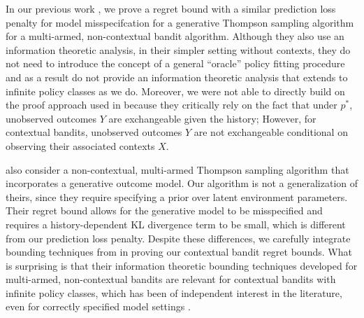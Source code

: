 In our previous work \citep{psar2024}, we prove a regret bound with a similar prediction loss penalty for model misspecifcation for a generative Thompson sampling algorithm for a multi-armed, non-contextual bandit algorithm. Although they also use an information theoretic analysis, in their simpler setting without contexts, they do not need to introduce the concept of a general ``oracle'' policy fitting procedure and as a result do not provide an information theoretic analysis that extends to infinite policy classes as we do.
Moreover, we were not able to directly build on the proof approach used in \citet{psar2024} because they critically rely on the fact that under $p^*$, unobserved outcomes $Y$ are exchangeable given the history; However, for contextual bandits, unobserved outcomes $Y$ are not exchangeable conditional on observing their associated contexts $X$. 

\citet{wen2021predictions} also consider a non-contextual, multi-armed Thompson sampling algorithm that incorporates a generative outcome model. Our algorithm is not a generalization of theirs, since they require specifying a prior over latent environment parameters. Their regret bound allows for the generative model to be misspecified and requires a history-dependent KL divergence term to be small, which is different from our prediction loss penalty. Despite these differences, we carefully integrate bounding techniques from \citet{wen2021predictions} in proving our contextual bandit regret bounds. What is surprising is that their information theoretic bounding techniques developed for multi-armed, non-contextual bandits are relevant for contextual bandits with infinite policy classes, which has been of independent interest in the literature, even for correctly specified model settings \citep{neu2022lifting,infotheoreticNonstationary}.

